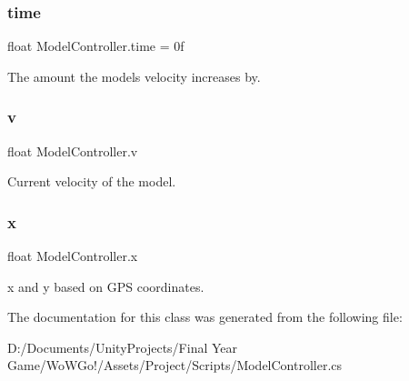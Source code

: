 \subsubsection{\texorpdfstring{time}{time}}
{\footnotesize\ttfamily float Model\+Controller.\+time = 0f\hspace{0.3cm}{\ttfamily [private]}}



The amount the models velocity increases by. 

\mbox{\label{class_model_controller_a8353ec90a68cf11775b83496a1030aea}} 
\subsubsection{\texorpdfstring{v}{v}}
{\footnotesize\ttfamily float Model\+Controller.\+v\hspace{0.3cm}{\ttfamily [private]}}



Current velocity of the model. 

\mbox{\label{class_model_controller_a04c854f156b7eafee7c558a5da07e7cb}} 
\subsubsection{\texorpdfstring{x}{x}}
{\footnotesize\ttfamily float Model\+Controller.\+x\hspace{0.3cm}{\ttfamily [private]}}



x and y based on G\+PS coordinates. 



The documentation for this class was generated from the following file\+:\begin{DoxyCompactItemize}
\item 
D\+:/\+Documents/\+Unity\+Projects/\+Final Year Game/\+Wo\+W\+Go!/\+Assets/\+Project/\+Scripts/Model\+Controller.\+cs\end{DoxyCompactItemize}
